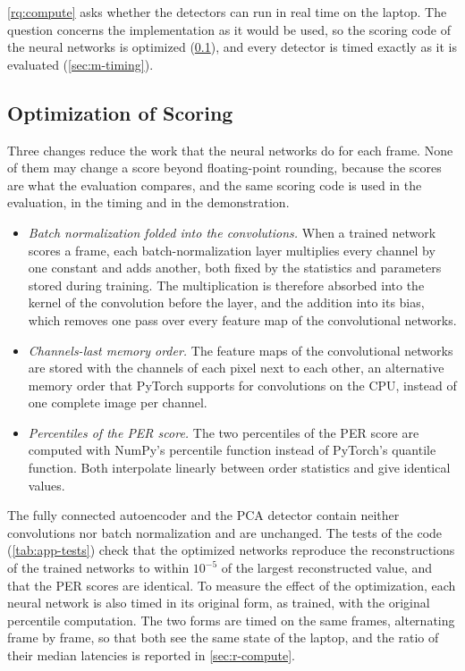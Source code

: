 \ref{rq:compute} asks whether the detectors can run in real time on the laptop. The question concerns the implementation as it would be used, so the scoring code of the neural networks is optimized (\cref{sec:m-optim}), and every detector is timed exactly as it is evaluated (\cref{sec:m-timing}).

\subsection{Optimization of Scoring}
\label{sec:m-optim}

Three changes reduce the work that the neural networks do for each frame. None of them may change a score beyond floating-point rounding, because the scores are what the evaluation compares, and the same scoring code is used in the evaluation, in the timing and in the demonstration.

\begin{itemize}
  \item \emph{Batch normalization folded into the convolutions.} When a trained network scores a frame, each batch-normalization layer multiplies every channel by one constant and adds another, both fixed by the statistics and parameters stored during training. The multiplication is therefore absorbed into the kernel of the convolution before the layer, and the addition into its bias, which removes one pass over every feature map of the convolutional networks.
  \item \emph{Channels-last memory order.} The feature maps of the convolutional networks are stored with the channels of each pixel next to each other, an alternative memory order that PyTorch supports for convolutions on the CPU, instead of one complete image per channel.
  \item \emph{Percentiles of the PER score.} The two percentiles of the PER score are computed with NumPy's percentile function instead of PyTorch's quantile function. Both interpolate linearly between order statistics and give identical values.
\end{itemize}

The fully connected autoencoder and the PCA detector contain neither convolutions nor batch normalization and are unchanged. The tests of the code (\cref{tab:app-tests}) check that the optimized networks reproduce the reconstructions of the trained networks to within $10^{-5}$ of the largest reconstructed value, and that the PER scores are identical. To measure the effect of the optimization, each neural network is also timed in its original form, as trained, with the original percentile computation. The two forms are timed on the same frames, alternating frame by frame, so that both see the same state of the laptop, and the ratio of their median latencies is reported in \cref{sec:r-compute}.

